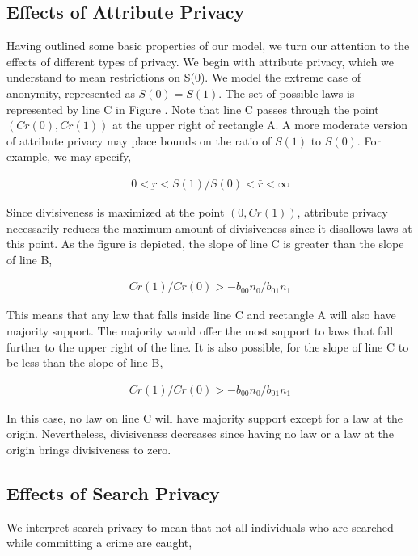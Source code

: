 \subsection{Effects of Attribute Privacy}

Having outlined some basic properties of our model, we turn our attention to the effects of different types of privacy.  We begin with attribute privacy, which we understand to mean restrictions on S(0).  We model the extreme case of anonymity, represented as $S(0) = S(1)$.  The set of possible laws is represented by line C in Figure .  Note that line C passes through the point $ \left(Cr(0), Cr(1) \right)$ at the upper right of rectangle A.  A more moderate version of attribute privacy may place bounds on the ratio of $S(1)$ to $S(0)$.  For example, we may specify,

\begin{align}
0 < \underbar r < S(1) /S(0) < \bar r < \infty
\end{align}

Since divisiveness is maximized at the point $ \left(0, Cr(1) \right)$, attribute privacy necessarily reduces the maximum amount of divisiveness since it disallows laws at this point.  As the figure is depicted, the slope of line C is greater than the slope of line B,

\begin{align}
Cr(1)/Cr(0) > - b_{00}n_0 / b_{01}n_1 
\end{align}

This means that any law that falls inside line C and rectangle A will also have majority support.  The majority would offer the most support to laws that fall further to the upper right of the line.  It is also possible, for the slope of line C to be less than the slope of line B,

\begin{align}
Cr(1)/Cr(0) > - b_{00}n_0 / b_{01}n_1 
\end{align}

In this case, no law on line C will have majority support except for a law at the origin.  Nevertheless, divisiveness decreases since having no law or a law at the origin brings divisiveness to zero.


\subsection{Effects of Search Privacy}

We interpret search privacy to mean that not all individuals who are searched while committing a crime are caught, 

